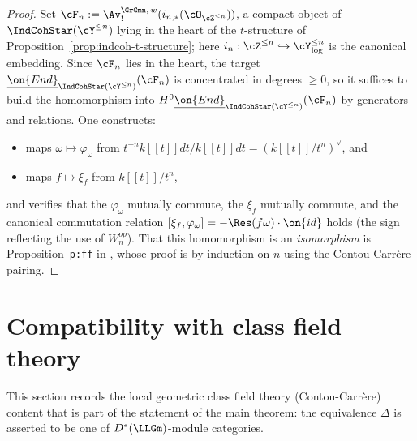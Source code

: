 \begin{proof}
  Set $\cF_n := \Av_!^{\GrGmn,\, w}(i_{n,*}(\cO_{\cZ^{\leq n}}))$, a compact
  object of $\IndCohStar(\cY^{\leq n})$ lying in the heart of the $t$-structure
  of Proposition~\ref{prop:indcoh-t-structure}; here
  $i_n : \cZ^{\leq n} \hookrightarrow \cY_{\log}^{\leq n}$ is the canonical
  embedding. Since $\cF_n$ lies in the heart, the target
  $\underline{\on{End}}_{\IndCohStar(\cY^{\leq n})}(\cF_n)$ is concentrated in
  degrees $\geq 0$, so it suffices to build the homomorphism into
  $H^0\underline{\on{End}}_{\IndCohStar(\cY^{\leq n})}(\cF_n)$ by generators
  and relations. One constructs:
  \begin{itemize}
    \item maps $\omega \mapsto \varphi_\omega$ from
      $t^{-n}k[[t]]dt/k[[t]]dt = (k[[t]]/t^n)^\vee$, and
    \item maps $f \mapsto \xi_f$ from $k[[t]]/t^n$,
  \end{itemize}
  and verifies that the $\varphi_\omega$ mutually commute, the $\xi_f$
  mutually commute, and the canonical commutation relation
  $[\xi_f, \varphi_\omega] = -\Res(f\omega)\cdot\on{id}$ holds (the sign
  reflecting the use of $W_n^{op}$). That this homomorphism is an
  \emph{isomorphism} is Proposition~\texttt{p:ff} in \cite{hilburn-raskin},
  whose proof is by induction on $n$ using the Contou-Carr\`ere pairing.
\end{proof}

\section{Compatibility with class field theory}
\label{sec:lcft}

This section records the local geometric class field theory (Contou-Carr\`ere)
content that is part of the statement of the main theorem: the equivalence
$\Delta$ is asserted to be one of $D^*(\LLGm)$-module categories.

